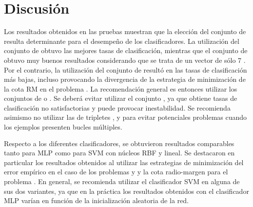 %
%
%
\section{Discusión}
%
Los resultados obtenidos en las pruebas muestran que la elección del
conjunto de  resulta determinante para el desempeño de los
clasificadores.
La utilización del conjunto de   obtuvo las
mejores tasas de clasificación, mientras que el conjunto de 
 obtuvo muy buenos resultados considerando que se trata de un
vector de sólo 7 .
Por el contrario, la utilización del conjunto de  
resultó en las tasas de clasificación más bajas, incluso provocando la
divergencia de la estrategia de minimización de la cota RM en el
problema \prob\mipred{}.
La recomendación general es entonces utilizar los conjuntos de 
 o .
Se deberá evitar utilizar el conjunto , ya que obtiene tasas
de clasificación no satisfactorias y puede provocar inestabilidad.
Se recomienda asimismo no utilizar las  de tripletes
,  y  para evitar potenciales problemas
cuando los ejemplos presenten bucles múltiples.

Respecto a los diferentes clasificadores, se obtuvieron resultados
comparables tanto para MLP como para SVM con núcleos RBF y lineal.
Se destacaron en particular los resultados obtenidos al utilizar las
estrategias de minimización del error empírico en el caso de los
problemas \prob\mipred{} y \prob\micropred{} y la cota radio-margen
para el problema \prob\tripletsvm{}.
En general, se recomienda utilizar el clasificador SVM en alguna de
sus dos variantes, ya que en la práctica los resultados obtenidos con
el clasificador MLP varían en función de la inicialización aleatoria
de la red.
